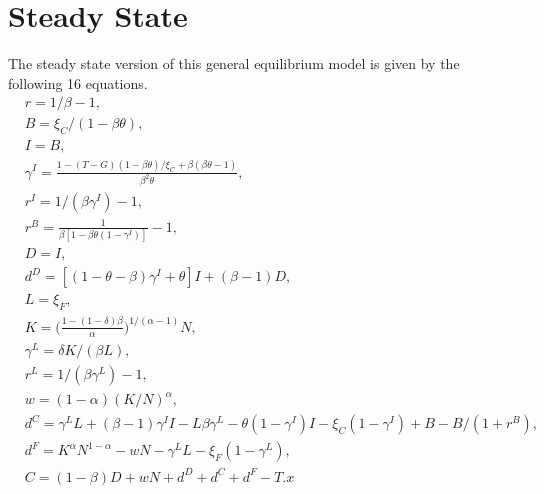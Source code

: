 \documentclass[12pt]{article}
\begin{document}
\section{Steady State}
The steady state version of this general equilibrium model is given by the following 16 equations.
\begin{align}
  &r=1/\beta-1, \\
  &B=\xi_C/(1-\beta \theta), \\
  &I=B,\\
  &\gamma^I=\frac{1-(T-G)(1-\beta \theta)/ \xi_C+\beta (\beta \theta-1)}{\beta^2 \theta},\\
  &r^I=1/(\beta \gamma^I)-1,\\
  &r^B=\frac{1}{\beta[1-\beta \theta(1-\gamma^I)]}-1,\\
  &D=I,\\
  &d^D=[(1-\theta-\beta)\gamma^I+\theta]I+(\beta-1)D,\\
  &L=\xi_F,\\
  &K=\bigg(\frac{1-(1-\delta) \beta} {\alpha}\bigg)^{1/(\alpha-1)}N,\\
  &\gamma^L=\delta K/(\beta L),\\
  &r^L=1/(\beta \gamma ^L)-1, \\
  &w=(1-\alpha)(K/N)^{\alpha},\\
  &d^C=\gamma^L L+(\beta-1)\gamma^I I-L\beta \gamma^L-\theta (1-\gamma^I)I-\xi_C(1-\gamma^I)+B-B/(1+r^B),\\
  &d^F=K^{\alpha}N^{1-\alpha}-wN-\gamma^L L-\xi_F(1-\gamma^L),\\
  &C=(1-\beta)D+wN+d^D+d^C+d^F-T.x
\end{align}
\end{document}
